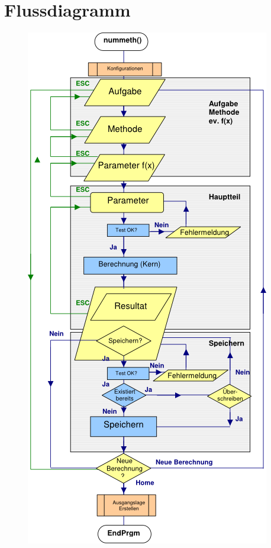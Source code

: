\documentclass[
	a4paper							%
	,12pt							%
	,twoside						%
	,openright						%
]{scrreprt}							%
\begin{document}
% 
\listoffigures
% 
\renewcommand{\bibname}{Literaturverzeichnis}
\nocite{AVM99}
\nocite{AVM02}
{}
% 
\appendix
\chapter{Flussdiagramm}
\label{sec:Flowchart}
\begin{figure}[h]
  \centering
  \includegraphics[height=0.74\textheight]{img/nummeth_flowchart.png}
\end{figure}

% 
%  
\end{document}
